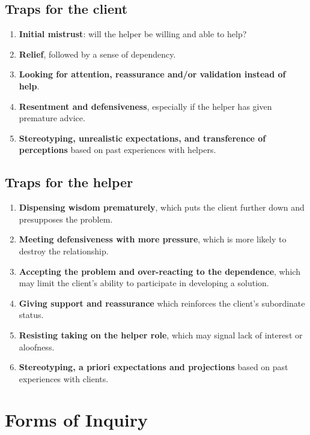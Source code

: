 \documentclass{article}
\newenvironment{nosepenumerate}
{ \begin{enumerate}
    \setlength{\itemsep}{0pt}
    \setlength{\parskip}{0pt}
    \setlength{\parsep}{0pt}     }
{ \end{enumerate}                  }
\begin{document}
\begin{multicols}{2}

\subsection{Traps for the client}
\begin{nosepenumerate}
    \item \textbf{Initial mistrust}: will the helper be willing and able to help?
    \item \textbf{Relief}, followed by a sense of dependency.
    \item \textbf{Looking for attention, reassurance and/or validation instead of help}.
    \item \textbf{Resentment and defensiveness}, especially if the helper has given premature advice.
    \item \textbf{Stereotyping, unrealistic expectations, and transference of perceptions} based on past experiences with helpers.
\end{nosepenumerate}

\vfill

\subsection{Traps for the helper}
\begin{nosepenumerate}
    \item \textbf{Dispensing wisdom prematurely}, which puts the client further down and presupposes the problem.
    \item \textbf{Meeting defensiveness with more pressure}, which is more likely to destroy the relationship.
    \item \textbf{Accepting the problem and over-reacting to the dependence}, which may limit the client's ability to participate in developing a solution.
    \item \textbf{Giving support and reassurance} which reinforces the client's subordinate status.
    \item \textbf{Resisting taking on the helper role}, which may signal lack of interest or aloofness.
    \item \textbf{Stereotyping, a priori expectations and projections} based on past experiences with clients.
\end{nosepenumerate}

\end{multicols}

\section{Forms of Inquiry}
\end{document}
